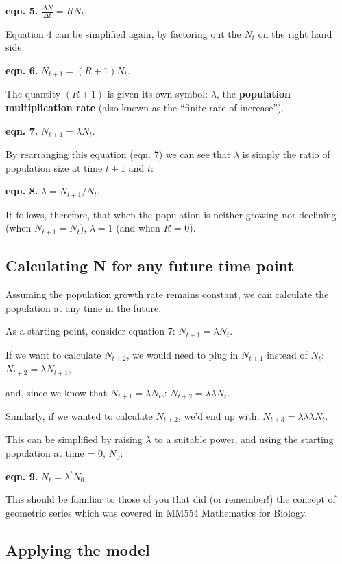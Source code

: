 \documentclass[
  a4paper]{book}
\begin{document}
\textbf{eqn. 5.} \(\frac{\Delta N}{\Delta t} = RN_t\).

Equation 4 can be simplified again, by factoring out the \(N_t\) on the right hand side:

\textbf{eqn. 6.} \(N_{t+1} = (R + 1)N_t\).

The quantity \((R+1)\) is given its own symbol: \(\lambda\), the \textbf{population multiplication rate} (also known as the ``finite rate of increase'').

\textbf{eqn. 7.} \(N_{t+1} = \lambda N_t\).

By rearranging this equation (eqn. 7) we can see that \(\lambda\) is simply the ratio of population size at time \(t+1\) and \(t\):

\textbf{eqn. 8.} \(\lambda = N_{t+1}/N_t\).

It follows, therefore, that when the population is neither growing nor declining (when \(N_{t+1}=N_t\)), \(\lambda = 1\) (and when \(R\) = 0).

\hypertarget{calculating-n-for-any-future-time-point}{%
\subsection{Calculating N for any future time point}\label{calculating-n-for-any-future-time-point}}

Assuming the population growth rate remains constant, we can calculate the population at any time in the future.

As a starting point, consider equation 7: \(N_{t+1} = \lambda N_t\).

If we want to calculate \(N_{t+2}\), we would need to plug in \(N_{t+1}\) instead of \(N_t\): \(N_{t+2} = \lambda N_{t+1}\),

and, since we know that \(N_{t+1} = \lambda N_t\),: \(N_{t+2} = \lambda \lambda N_t\).

Similarly, if we wanted to calculate \(N_{t+2}\), we'd end up with: \(N_{t+3} = \lambda \lambda \lambda N_t\).

This can be simplified by raising \(\lambda\) to a suitable power, and using the starting population at time = 0, \(N_0\):

\textbf{eqn. 9.} \(N_{t} = \lambda ^tN_0\).

This should be familiar to those of you that did (or remember!) the concept of geometric series which was covered in MM554 Mathematics for Biology.

\hypertarget{applying-the-model}{%
\subsection{Applying the model}\label{applying-the-model}}
\end{document}
